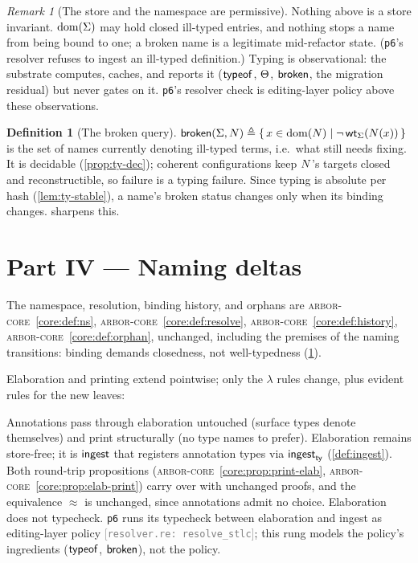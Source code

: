 \documentclass[11pt]{article}
\theoremstyle{definition}
\newtheorem{definition}{Definition}[section]
\theoremstyle{plain}
\theoremstyle{remark}
\newtheorem{remark}{Remark}[section]
\newcommand{\src}[1]{{\footnotesize\textcolor{gray}{[\texttt{#1}]}}}
\newcommand{\arborcore}{\textsc{arbor-core}}
\newcommand{\coreref}[1]{\arborcore~\cref{core:#1}}
\begin{document}
\begin{remark}[The store and the namespace are permissive]\label{rem:permissive}
Nothing above is a store invariant. $\operatorname{dom}(\Sigma)$ may hold closed ill-typed entries, and
nothing stops a name from being bound to one; a broken name is a legitimate mid-refactor
state. (\texttt{p6}'s resolver refuses to ingest an ill-typed definition.) Typing is
observational: the substrate computes, caches, and reports it ($\mathsf{typeof}$, $\Theta$,
$\mathsf{broken}$, the migration residual) but never gates on it. \texttt{p6}'s resolver check is
editing-layer policy above these observations.
\end{remark}

\begin{definition}[The broken query]\label{def:broken}
$\mathsf{broken}(\Sigma,N) \triangleq \{\, x \in \operatorname{dom}(N) \mid \lnot\,\mathsf{wt}_{\Sigma}(N(x))\,\}$
is the set of names currently denoting ill-typed terms, i.e.\ what still needs fixing. It is
decidable (\cref{prop:ty-dec}); coherent configurations keep $N$'s targets closed and
reconstructible, so failure is a typing failure. Since typing is absolute per hash
(\cref{lem:ty-stable}), a name's broken status changes only when its binding changes.
 sharpens this.
\end{definition}

\section{Part IV --- Naming deltas}\label{sec:naming}

The namespace, resolution, binding history, and orphans are \coreref{def:ns},
\coreref{def:resolve}, \coreref{def:history}, \coreref{def:orphan}, unchanged, including
the premises of the naming transitions: binding demands closedness, not well-typedness
(\cref{rem:permissive}).

Elaboration and printing extend pointwise; only the $\lambda$ rules change, plus evident
rules for the new leaves:
Annotations pass through elaboration untouched (surface types denote themselves) and print
structurally (no type names to prefer). Elaboration remains store-free; it is $\mathsf{ingest}$
that registers annotation types via $\mathsf{ingest}_{\mathsf{ty}}$ (\cref{def:ingest}). Both round-trip
propositions (\coreref{prop:print-elab}, \coreref{prop:elab-print}) carry over with
unchanged proofs, and the equivalence $\approx$ is unchanged, since annotations admit no
choice. Elaboration does not typecheck. \texttt{p6} runs its typecheck between elaboration
and ingest as editing-layer policy \src{resolver.re: resolve\_stlc}; this rung models the
policy's ingredients ($\mathsf{typeof}$, $\mathsf{broken}$), not the policy.
\end{document}
